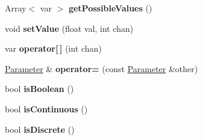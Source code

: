 \begin{DoxyCompactItemize}
\item 
\hypertarget{classParameter_a9c111935ac7686c6d553e8cbfdcd6586}{Array$<$ var $>$ {\bfseries get\-Possible\-Values} ()}\label{classParameter_a9c111935ac7686c6d553e8cbfdcd6586}

\item 
\hypertarget{classParameter_a8e5409218cb787ff761c69ca9f77c438}{void {\bfseries set\-Value} (float val, int chan)}\label{classParameter_a8e5409218cb787ff761c69ca9f77c438}

\item 
\hypertarget{classParameter_a62dcb99c0702e094dab71655d5d7fed8}{var {\bfseries operator\mbox{[}$\,$\mbox{]}} (int chan)}\label{classParameter_a62dcb99c0702e094dab71655d5d7fed8}

\item 
\hypertarget{classParameter_a1f27fe3b3fc432f646d0c5244f495b8d}{\hyperlink{classParameter}{Parameter} \& {\bfseries operator=} (const \hyperlink{classParameter}{Parameter} \&other)}\label{classParameter_a1f27fe3b3fc432f646d0c5244f495b8d}

\item 
\hypertarget{classParameter_a0c25100815bda4ae19801fc146529535}{bool {\bfseries is\-Boolean} ()}\label{classParameter_a0c25100815bda4ae19801fc146529535}

\item 
\hypertarget{classParameter_a022c66a8409c6456f9b2d8a3465f0560}{bool {\bfseries is\-Continuous} ()}\label{classParameter_a022c66a8409c6456f9b2d8a3465f0560}

\item 
\hypertarget{classParameter_ac048c296eaaad1d1b168875c932b5681}{bool {\bfseries is\-Discrete} ()}\label{classParameter_ac048c296eaaad1d1b168875c932b5681}

\end{DoxyCompactItemize}
